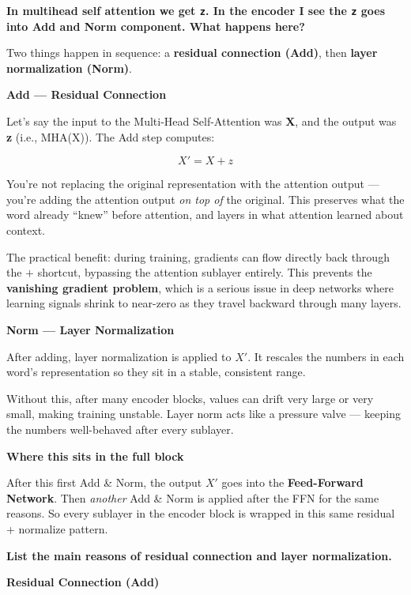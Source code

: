 \bigskip

\textbf{In multihead self attention we get \texttt{z}. In the encoder I see the \texttt{z} goes into Add and Norm component. What happens here?}

Two things happen in sequence: a \textbf{residual connection (Add)}, then \textbf{layer normalization (Norm)}.

\bigskip
\textbf{Add --- Residual Connection}

Let's say the input to the Multi-Head Self-Attention was \textbf{X}, and the output was \textbf{z} (i.e., MHA(X)). The Add step computes:

\[
X' = X + z
\]

You're not replacing the original representation with the attention output --- you're adding the attention output \textit{on top of} the original. This preserves what the word already ``knew'' before attention, and layers in what attention learned about context.

The practical benefit: during training, gradients can flow directly back through the $+$ shortcut, bypassing the attention sublayer entirely. This prevents the \textbf{vanishing gradient problem}, which is a serious issue in deep networks where learning signals shrink to near-zero as they travel backward through many layers.

\bigskip
\textbf{Norm --- Layer Normalization}

After adding, layer normalization is applied to $X'$. It rescales the numbers in each word's representation so they sit in a stable, consistent range.

Without this, after many encoder blocks, values can drift very large or very small, making training unstable. Layer norm acts like a pressure valve --- keeping the numbers well-behaved after every sublayer.

\bigskip
\textbf{Where this sits in the full block}

After this first Add \& Norm, the output $X'$ goes into the \textbf{Feed-Forward Network}. Then \textit{another} Add \& Norm is applied after the FFN for the same reasons. So every sublayer in the encoder block is wrapped in this same residual + normalize pattern.


\bigskip\bigskip
\textbf{List the main reasons of residual connection and layer normalization.}

\textbf{Residual Connection (Add)}

